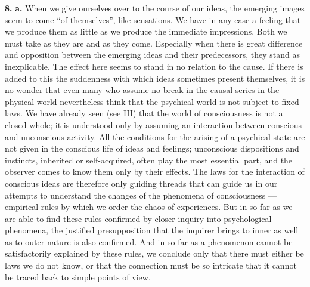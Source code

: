 \documentclass[12pt,a4paper]{book}
\begin{document}
\textbf{8.} \textbf{a.} When we give ourselves over to the course of our
ideas, the emerging images seem to come ``of themselves'', like
sensations. We have in any case a feeling that we produce them as little
as we produce the immediate impressions. Both we must take as they are and
as they come. Especially when there is great difference and opposition
between the emerging ideas and their predecessors, they stand as
inexplicable. The effect here seems to stand in no relation to the cause.
If there is added to this the suddenness with which ideas sometimes
present themselves, it is no wonder that even many who assume no break in
the causal series in the physical world nevertheless think that the
psychical world is not subject to fixed laws. We have already seen (see
III) that the world of consciousness is not a closed whole; it is
understood only by assuming an interaction between conscious and
unconscious activity. All the conditions for the arising of a psychical
state are not given in the conscious life of ideas and feelings;
unconscious dispositions and instincts, inherited or self-acquired, often
play the most essential part, and the observer comes to know them only by
their effects. The laws for the interaction of conscious ideas are
therefore only guiding threads that can guide us in our attempts to
understand the changes of the phenomena of consciousness --- empirical
rules by which we order the chaos of experiences. But in so far as we are
able to find these rules confirmed by closer inquiry into psychological
phenomena, the justified presupposition that the inquirer brings to inner
as well as to outer nature is also confirmed. And in so far as a
phenomenon cannot be satisfactorily explained by these rules, we conclude
only that there must either be laws we do not know, or that the connection
must be so intricate that it cannot be traced back to simple points of
view.
\end{document}
